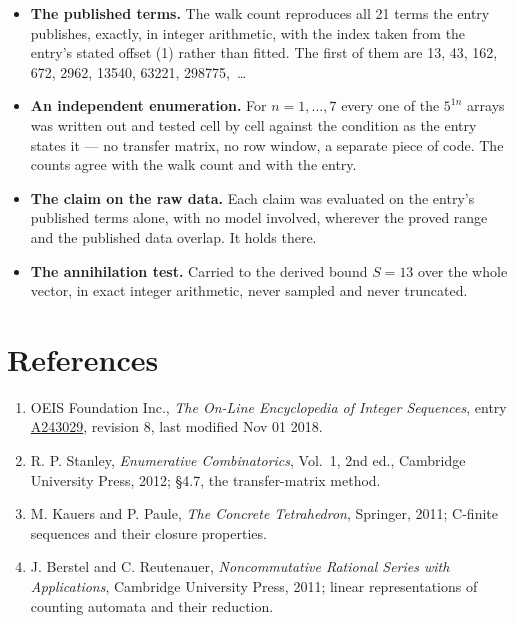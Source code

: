 \documentclass[11pt]{article}
\theoremstyle{definition}
\begin{document}
\begin{itemize}

\item {\bfseries The published terms.} The walk count reproduces all 21 terms the entry publishes, exactly, in integer arithmetic, with the index taken from the entry's stated offset (1) rather than fitted. The first of them are 13, 43, 162, 672, 2962, 13540, 63221, 298775,~\dots

\item {\bfseries An independent enumeration.} For $n = 1,\dots,7$ every one of the $5^{1n}$ arrays was written out and tested cell by cell against the condition as the entry states it --- no transfer matrix, no row window, a separate piece of code. The counts agree with the walk count and with the entry.

\item {\bfseries The claim on the raw data.} Each claim was evaluated on the entry's published terms alone, with no model involved, wherever the proved range and the published data overlap. It holds there.

\item {\bfseries The annihilation test.} Carried to the derived bound $S = 13$ over the whole vector, in exact integer arithmetic, never sampled and never truncated.

\end{itemize}

\section{References}

\begin{enumerate}

\item OEIS Foundation Inc., \emph{The On-Line Encyclopedia of Integer Sequences}, entry \href{https://oeis.org/A243029}{A243029}, revision 8, last modified Nov 01 2018.

\item R. P. Stanley, \emph{Enumerative Combinatorics}, Vol.~1, 2nd ed., Cambridge University Press, 2012; \S4.7, the transfer-matrix method.

\item M. Kauers and P. Paule, \emph{The Concrete Tetrahedron}, Springer, 2011; C-finite sequences and their closure properties.

\item J. Berstel and C. Reutenauer, \emph{Noncommutative Rational Series with Applications}, Cambridge University Press, 2011; linear representations of counting automata and their reduction.

\end{enumerate}
\end{document}
